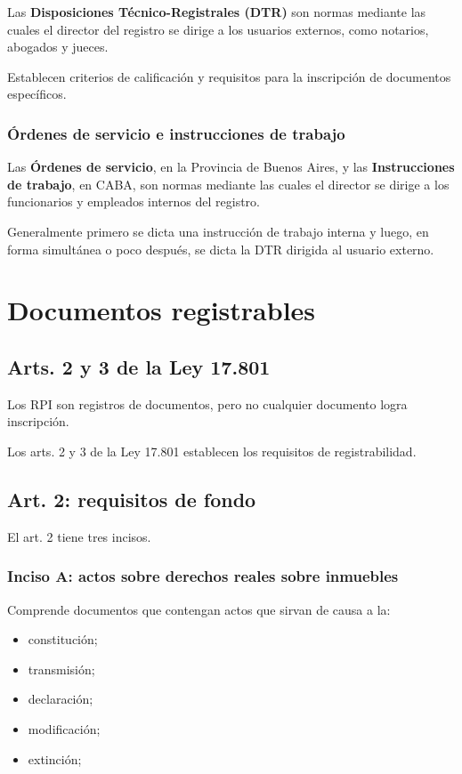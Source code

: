 \documentclass[12pt]{book}
\begin{document}
Las \textbf{Disposiciones T\'ecnico-Registrales (DTR)} son normas mediante las cuales el director del registro se dirige a los usuarios externos, como notarios, abogados y jueces.

Establecen criterios de calificaci\'on y requisitos para la inscripci\'on de documentos espec\'ificos.

\subsection{\'Ordenes de servicio e instrucciones de trabajo}

Las \textbf{\'Ordenes de servicio}, en la Provincia de Buenos Aires, y las \textbf{Instrucciones de trabajo}, en CABA, son normas mediante las cuales el director se dirige a los funcionarios y empleados internos del registro.

Generalmente primero se dicta una instrucci\'on de trabajo interna y luego, en forma simult\'anea o poco despu\'es, se dicta la DTR dirigida al usuario externo.

\chapter{Documentos registrables}

\section{Arts. 2 y 3 de la Ley 17.801}

Los RPI son registros de documentos, pero no cualquier documento logra inscripci\'on.

Los arts. 2 y 3 de la Ley 17.801 establecen los requisitos de registrabilidad.

\section{Art. 2: requisitos de fondo}

El art. 2 tiene tres incisos.

\subsection{Inciso A: actos sobre derechos reales sobre inmuebles}

Comprende documentos que contengan actos que sirvan de causa a la:

\begin{itemize}
    \item constituci\'on;
    \item transmisi\'on;
    \item declaraci\'on;
    \item modificaci\'on;
    \item extinci\'on;
\end{itemize}
\end{document}
